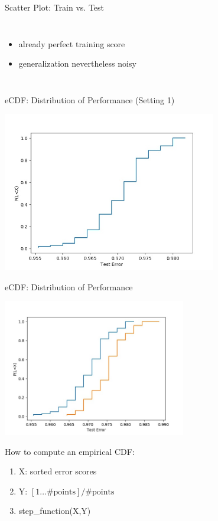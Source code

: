 \begin{frame}[c]{Scatter Plot: Train vs. Test}
\begin{columns}
\begin{itemize}
	\item already perfect training score
	\item generalization nevertheless noisy
\end{itemize}
	
\end{columns}
	
\end{frame}
\begin{frame}[c]{eCDF: Distribution of Performance (Setting 1)}

\centering
\includegraphics[width=0.7\textwidth]{scripts/mlp1_test_ecdf.jpg}

\end{frame}
\begin{frame}[c]{eCDF: Distribution of Performance}

\centering
\includegraphics[width=0.6\textwidth]{scripts/mlp12_test_ecdf.jpg}

\begin{flushleft}
How to compute an empirical CDF:
\begin{enumerate}
	\item X: sorted error scores
	\item Y: $[1\ldots\#\text{points}] / \#\text{points}$
	\item step\_function(X,Y)
\end{enumerate}
\end{flushleft}

\end{frame}
